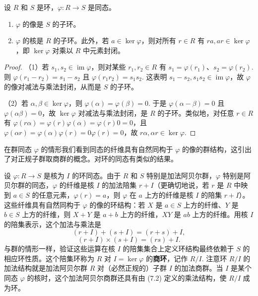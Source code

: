 \begin{proposition}\label{pro:7.5}
设 \(R\) 和 \(S\) 是环，\(\varphi : R \to S\) 是同态。

\begin{enumerate}[label=(\arabic*)]
\item \(\varphi\) 的像是 \(S\) 的子环。
\item \(\varphi\) 的核是 \(R\) 的子环。此外，若 \(a \in \ker \varphi\)，则对所有 \(r \in R\) 有 \(ra, ar \in \ker \varphi\)，即 \(\ker \varphi\) 对乘以 \(R\) 中元素封闭。
\end{enumerate}
\end{proposition}

\begin{proof}
（1）若 \(s_1, s_2 \in \operatorname{im}\varphi\)，则对某些 \(r_1, r_2 \in R\) 有 \(s_1 = \varphi(r_1)\)、\(s_2 = \varphi(r_2)\). 则 \(\varphi(r_1 - r_2) = s_1 - s_2\) 且 \(\varphi(r_1r_2) = s_1s_2\). 这表明 \(s_1 - s_2, s_1s_2 \in \operatorname{im}\varphi\)，故 \(\varphi\) 的像对减法与乘法封闭，从而是 \(S\) 的子环。

（2）若 \(\alpha, \beta \in \ker\varphi\)，则 \(\varphi(\alpha) = \varphi(\beta) = 0\). 于是 \(\varphi(\alpha - \beta) = 0\) 且 \(\varphi(\alpha\beta) = 0\)，故 \(\ker\varphi\) 对减法与乘法封闭，是 \(R\) 的子环。类似地，对任意 \(r \in R\) 有 \(\varphi(r\alpha) = \varphi(r)\varphi(\alpha) = \varphi(r)0 = 0\)，且 \(\varphi(\alpha r) = \varphi(\alpha)\varphi(r) = 0\varphi(r) = 0\)，故 \(r\alpha, \alpha r \in \ker\varphi\).
\end{proof}

在群同态 \(\varphi\) 的情形我们看到同态的纤维具有自然同构于 \(\varphi\) 的像的群结构，这引出了对正规子群取商群的概念。对环的同态有类似的结果。

设 \(\varphi : R \to S\) 是核为 \(I\) 的环同态。由于 \(R\) 和 \(S\) 特别是加法阿贝尔群，\(\varphi\) 特别是阿贝尔群的同态，\(\varphi\) 的纤维是核 \(I\) 的加法陪集 \(r + I\)（更确切地说，若 \(r\) 是 \(R\) 中映到 \(a \in S\) 的任意元素，\(\varphi(r) = a\)，则 \(\varphi\) 在 \(a\) 上方的纤维是核 \(I\) 的陪集 \(r+I\)）。这些纤维具有自然同构于 \(\varphi\) 的像的环结构：若 \(X\) 是 \(a \in S\) 上方的纤维、\(Y\) 是 \(b \in S\) 上方的纤维，则 \(X+Y\) 是 \(a+b\) 上方的纤维，\(XY\) 是 \(ab\) 上方的纤维。用核 \(I\) 的陪集表示，这个加法与乘法是
\[
(r+I) + (s+I) = (r+s)+I, \tag{7.1}
\]
\[
(r+I) \times (s+I) = (rs)+I. \tag{7.2}
\]
与群的情形一样，验证这些运算在核 \(I\) 的陪集集合上定义环结构最终依赖于 \(S\) 的相应环性质。这个陪集环称为 \(R\) 对 \(I = \ker\varphi\) 的\textbf{商环}，记作 \(R/I\). 注意环 \(R/I\) 的加法结构就是加法阿贝尔群 \(R\) 对（必然正规的）子群 \(I\) 的加法商群。当 \(I\) 是某个同态 \(\varphi\) 的核时，这个加法阿贝尔商群还具有由 (7.2) 定义的乘法结构，使 \(R/I\) 成为环。

